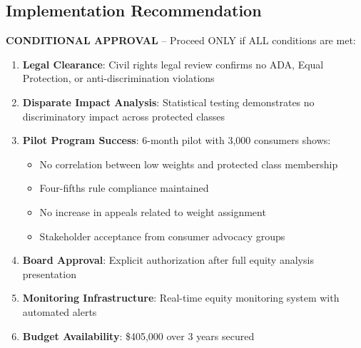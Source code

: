 \subsection{Implementation Recommendation}

\textbf{CONDITIONAL APPROVAL} -- Proceed ONLY if ALL conditions are met:

\begin{enumerate}
    \item \textbf{Legal Clearance}: Civil rights legal review confirms no ADA, Equal Protection, or anti-discrimination violations
    
    \item \textbf{Disparate Impact Analysis}: Statistical testing demonstrates no discriminatory impact across protected classes
    
    \item \textbf{Pilot Program Success}: 6-month pilot with 3,000 consumers shows:
    \begin{itemize}
        \item No correlation between low weights and protected class membership
        \item Four-fifths rule compliance maintained
        \item No increase in appeals related to weight assignment
        \item Stakeholder acceptance from consumer advocacy groups
    \end{itemize}
    
    \item \textbf{Board Approval}: Explicit authorization after full equity analysis presentation
    
    \item \textbf{Monitoring Infrastructure}: Real-time equity monitoring system with automated alerts
    
    \item \textbf{Budget Availability}: \$405,000 over 3 years secured
\end{enumerate}


